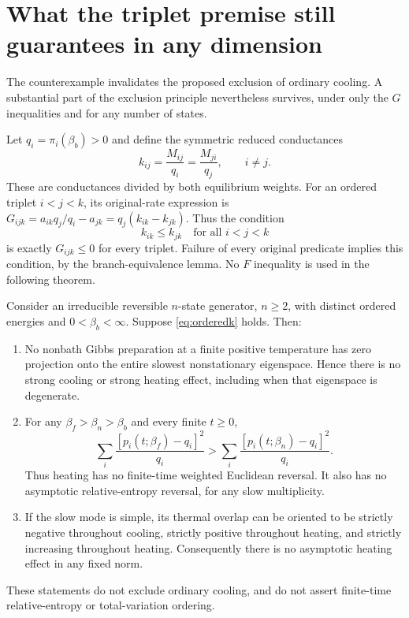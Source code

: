 \section{What the triplet premise still guarantees in any dimension}\label{sec:orderedconductances}
The counterexample invalidates the proposed exclusion of ordinary cooling.
A substantial part of the exclusion principle nevertheless survives, under
only the $G$ inequalities and for any number of states.

Let $q_i=\pi_i(\beta_b)>0$ and define the symmetric reduced conductances
\[
k_{ij}=\frac{M_{ij}}{q_i}=\frac{M_{ji}}{q_j},\qquad i\ne j.
\]
These are conductances divided by both equilibrium weights. For an ordered
triplet $i<j<k$, its original-rate expression is
$G_{ijk}=a_{ik}q_j/q_i-a_{jk}=q_j(k_{ik}-k_{jk})$. Thus the condition
\begin{equation}\label{eq:orderedk}
k_{ik}\leq k_{jk}\quad\text{for all }i<j<k
\end{equation}
is exactly $G_{ijk}\leq0$ for every triplet. Failure of every original
predicate implies this condition, by the branch-equivalence lemma. No
$F$ inequality is used in the following theorem.

\begin{theorem}\label{thm:orderedk}
Consider an irreducible reversible $n$-state generator, $n\geq2$, with distinct ordered
energies and $0<\beta_b<\infty$. Suppose \eqref{eq:orderedk} holds.
Then:
\begin{enumerate}
\item No nonbath Gibbs preparation at a finite positive temperature has zero
projection onto the entire slowest nonstationary eigenspace. Hence there is
no strong cooling or strong heating effect, including when that eigenspace
is degenerate.
\item For any $\beta_f>\beta_n>\beta_b$ and every finite $t\geq0$,
\[
\sum_i\frac{[p_i(t;\beta_f)-q_i]^2}{q_i}
>
\sum_i\frac{[p_i(t;\beta_n)-q_i]^2}{q_i}.
\]
Thus heating has no finite-time weighted Euclidean reversal. It also has
no asymptotic relative-entropy reversal, for any slow multiplicity.
\item If the slow mode is simple, its thermal overlap can be oriented to be
strictly negative throughout cooling, strictly positive throughout heating,
and strictly increasing throughout heating. Consequently there is no
asymptotic heating effect in any fixed norm.
\end{enumerate}
These statements do not exclude ordinary cooling, and do not assert
finite-time relative-entropy or total-variation ordering.
\end{theorem}

